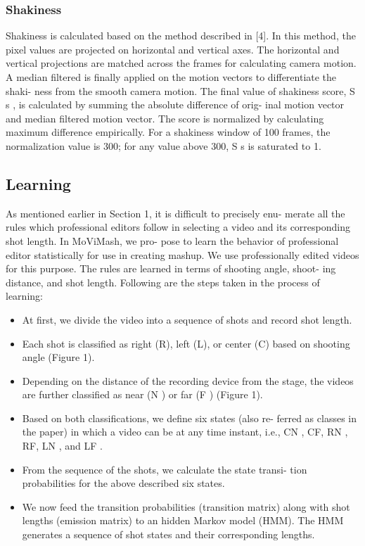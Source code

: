 \documentclass{sig-alternate}
\begin{document}
\subsubsection{Shakiness}
Shakiness is calculated based on the method described in [4].
In this method, the pixel values are projected on horizontal and
vertical axes. The horizontal and vertical projections are matched
across the frames for calculating camera motion. A median filtered
is finally applied on the motion vectors to differentiate the shaki-
ness from the smooth camera motion. The final value of shakiness
score, S s , is calculated by summing the absolute difference of orig-
inal motion vector and median filtered motion vector. The score is
normalized by calculating maximum difference empirically. For a
shakiness window of 100 frames, the normalization value is 300;
for any value above 300, S s is saturated to 1.



\subsection{Learning}
As mentioned earlier in Section 1, it is difficult to precisely enu-
merate all the rules which professional editors follow in selecting
a video and its corresponding shot length. In MoViMash, we pro-
pose to learn the behavior of professional editor statistically for use
in creating mashup. We use professionally edited videos for this
purpose. The rules are learned in terms of shooting angle, shoot-
ing distance, and shot length. Following are the steps taken in the
process of learning:

\begin{itemize}
    \item At first, we divide the video into a sequence of shots and
record shot length.
    \item Each shot is classified as right (R), left (L), or center (C)
based on shooting angle (Figure 1). 
    \item Depending on the distance of the recording device from the
stage, the videos are further classified as near (N ) or far (F )
(Figure 1).
    \item Based on both classifications, we define six states (also re-
ferred as classes in the paper) in which a video can be at any
time instant, i.e., CN , CF, RN , RF, LN , and LF .
    \item From the sequence of the shots, we calculate the state transi-
tion probabilities for the above described six states.
    \item We now feed the transition probabilities (transition matrix)
along with shot lengths (emission matrix) to an hidden Markov
model (HMM). The HMM generates a sequence of shot states
and their corresponding lengths.
\end{itemize}
\end{document}
